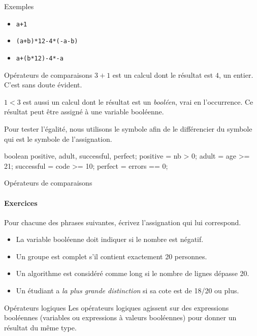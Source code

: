 \begin{hideedit}
\begin{frame}[fragile]{Exemples}
  \begin{itemize}[<+->]
    \item \Verb_a+1_
    \item \Verb_(a+b)*12-4*(-a-b)_
    \item \Verb_a+(b*12)-4*-a_
  \end{itemize}
\end{frame}

\begin{frame}[fragile]{Opérateurs de comparaisons}
  $3+1$ est un calcul dont le résultat est $4$, un entier. C'est sans
  doute évident.

  $1<3$ est aussi un calcul dont le résultat est un \emph{booléen},
  vrai en l’occurrence.  Ce résultat peut être assigné à une variable
  booléenne.

  Pour tester l'égalité, nous utilisons le symbole \pc{==} afin de le
  différencier du symbole \pc{=} qui est le symbole de l'assignation.

  \begin{java}
boolean positive, adult, successful, perfect;
positive = nb > 0;
adult = age >= 21;
successful = code >= 10;
perfect = errors == 0;
\end{java}
\end{frame}


\begin{frame}{Opérateurs de comparaisons}
  \framesubtitle{Exercices}
  Pour chacune des phrases suivantes,
  écrivez l’assignation qui lui correspond.
  \begin{itemize}
  \item
    La variable booléenne 
    doit indiquer si le nombre  est négatif.
  \item
    Un groupe est complet s’il contient exactement 20 personnes.
  \item
    Un algorithme est considéré comme long si le nombre de lignes
    dépasse 20.
  \item
    Un étudiant a \emph{la plus grande distinction} si sa cote est
    de 18/20 ou plus.
  \end{itemize}
\end{frame}

\begin{frame}{Opérateurs logiques}
  Les opérateurs logiques agissent sur des expressions booléennes
  (variables ou expressions à valeurs booléennes)
  pour donner un résultat du même type.


\end{frame}
\end{hideedit}
